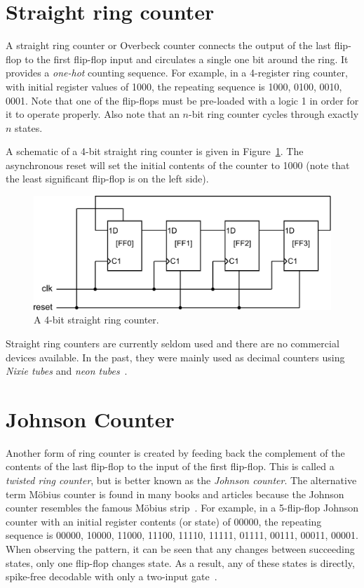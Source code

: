 \documentclass[12pt,a4paper,final,twoside,fleqn]{article}
\begin{document}
\section{Straight ring counter}
A straight ring counter or Overbeck counter connects the output of the last
flip-flop to the first flip-flop input and circulates a single one bit around
the ring. It provides a \textsl{one-hot} counting sequence. For example, in a
4-register ring counter, with initial register values of 1000, the repeating
sequence is 1000, 0100, 0010, 0001. Note that one of the flip-flops must be
pre-loaded with a logic 1 in order for it to operate properly. Also note that
an $n$-bit ring counter cycles through exactly $n$ states.

A schematic of a 4-bit straight ring counter is given in
Figure~\ref{fig:straightringcounter}. The asynchronous reset will set the
initial contents of the counter to 1000 (note that the least significant
flip-flop is on the left side).

\begin{figure}[h!]
  \centering
  \includegraphics[scale=0.60]{straightringcounter_4bit}
  \caption[A 4-bit straight ring counter]{A 4-bit straight ring counter.}
  \label{fig:straightringcounter}
\end{figure}

Straight ring counters are currently seldom used and there are no commercial
devices available. In the past, they were mainly used as decimal counters using
\textsl{Nixie tubes} and \textsl{neon tubes}~\cite{manley1950,dekker2015}.


\section{Johnson Counter}
Another form of ring counter is created by feeding back the complement of the contents
of the last flip-flop to the input of the first flip-flop. This is called a
\textsl{twisted ring counter}, but is better known as the \textsl{Johnson counter}.
The alternative term M\"obius counter is found in many books and articles because
the Johnson counter resembles the famous M\"obius strip~\cite{wiki2015a}. For example,
in a 5-flip-flop Johnson counter with an initial register contents (or state) of 00000,
the repeating sequence is 00000, 10000, 11000, 11100, 11110, 11111, 01111, 00111, 00011,
00001. When observing the pattern, it can be seen that any changes between succeeding
states, only one flip-flop changes state. As a result, any of these states is directly,
spike-free decodable with only a two-input
\mbox{gate~\cite{brcic1965,asicdigitaldesign2015}.}
\end{document}
